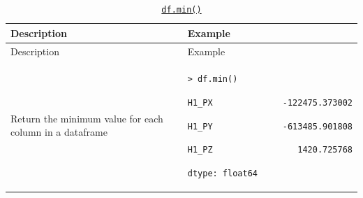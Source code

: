 \documentclass[10pt,a4paperpaper,]{article}
\begin{document}
\begin{longtable}[]{@{}ll@{}}
\caption{\href{http://pandas.pydata.org/pandas-docs/stable/generated/pandas.DataFrame.min.html}{\texttt{df.min()}}}\tabularnewline
\toprule
\begin{minipage}[b]{0.47\columnwidth}\raggedright\strut
Description
\strut\end{minipage} &
\begin{minipage}[b]{0.47\columnwidth}\raggedright\strut
Example
\strut\end{minipage}\tabularnewline
\midrule
\endfirsthead
\toprule
\begin{minipage}[b]{0.47\columnwidth}\raggedright\strut
Description
\strut\end{minipage} &
\begin{minipage}[b]{0.47\columnwidth}\raggedright\strut
Example
\strut\end{minipage}\tabularnewline
\midrule
\endhead
\begin{minipage}[t]{0.47\columnwidth}\raggedright\strut
Return the minimum value for each column in a dataframe
\strut\end{minipage} &
\begin{minipage}[t]{0.47\columnwidth}\raggedright\strut
\texttt{\textgreater{}\ df.min()}

\texttt{H1\_PX\ \ \ \ \ \ \ \ \ \ \ \ \ \ -122475.373002}

\texttt{H1\_PY\ \ \ \ \ \ \ \ \ \ \ \ \ \ -613485.901808}

\texttt{H1\_PZ\ \ \ \ \ \ \ \ \ \ \ \ \ \ \ \ \ 1420.725768}

\texttt{dtype:\ float64}
\strut\end{minipage}\tabularnewline
\bottomrule
\end{longtable}
\end{document}
